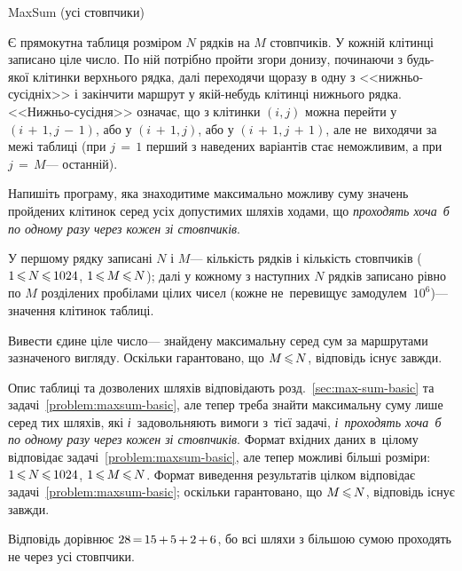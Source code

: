 ﻿\begin{problemAllDefault}{MaxSum (усі стовпчики)}\label{problem:maxsum-all-columns}

\ifisART
\else
Є прямокутна таблиця розміром $N$ рядків на $M$ стовпчиків. У кожній клітинці записано ціле число. 
По ній потрібно пройти згори донизу, починаючи з будь-якої клітинки верхнього рядка, 
далі переходячи щоразу в одну з <<нижньо-сусідніх>> і закінчити маршрут у якій-небудь клітинці нижнього рядка. 
<<Нижньо-сусідня>> означає, що з клітинки $(i,j)$ можна перейти у ${(i\,{+}\,1,j\,{-}\,1)}$, 
або у ${(i\,{+}\,1,j)}$, або у ${(i\,{+}\,1,j\,{+}\,1)}$, але не~виходячи за межі таблиці 
(при ${j\,{=}\,1}$ перший з наведених варіантів стає неможливим, а при ${j\,{=}\,M}$\nolinebreak[3] --- останній).

Напишіть програму, яка знаходитиме максимально можливу суму значень пройдених клітинок 
серед усіх допустимих шляхів ходами, що
\emph{проходять хоча~б по одному разу через кожен зі стовпчиків}. 

\InputFile
У першому рядку записані $N$ і $M$\nolinebreak[3] --- кількість рядків і кількість стовпчиків 
(${1\,{\leqslant}\,N\,{\leqslant}\,1024}$, ${1\,{\leqslant}\,M\,{\leqslant}\,N}$); далі у кожному з наступних $N$ рядків 
записано рівно по $M$ розділених пробілами цілих чисел (кожне не~перевищує за\nolinebreak[2] модулем~$10^6$)\nolinebreak[3] --- 
значення клітинок таблиці. 

\OutputFile
Вивести єдине ціле число\nolinebreak[3] --- знайдену максимальну серед сум за маршрутами зазначеного вигляду.
Оскільки гарантовано, що ${M\,{\leqslant}\,N}$, відповідь існує завжди.

\fi


\ifisART
%
\myflfigaw{\begin{exampleSimple}{5em}{5em}%

\end{exampleSimple}}
Опис таблиці та дозволених шляхів відповідають розд.~\ref{sec:max-sum-basic} та задачі~\ref{problem:maxsum-basic}, але тепер треба знайти максимальну суму лише серед тих шляхів, які \emph{і}~задовольняють вимоги з~тієї задачі, \emph{і~проходять хоча~б по одному разу через кожен зі стовпчиків}.
Формат вхідних даних в~цілому відповідає задачі~\ref{problem:maxsum-basic}, але тепер можливі більші розміри: ${1\,{\leqslant}\,N\,{\leqslant}\,1024}$, ${1\,{\leqslant}\,M\,{\leqslant}\,N}$. Формат виведення результатів цілком відповідає задачі~\ref{problem:maxsum-basic}; оскільки гарантовано, що ${M\,{\leqslant}\,N}$, відповідь існує завжди.
%
\else
%
\Example
\begin{example}%

\end{example}
%
\fi


\Notes
Відповідь дорівнює $28\dib{{=}}15\dib{{+}}5\dib{{+}}2\dib{{+}}6$, бо всі шляхи з більшою сумою проходять не через усі стовпчики.


\end{problemAllDefault}